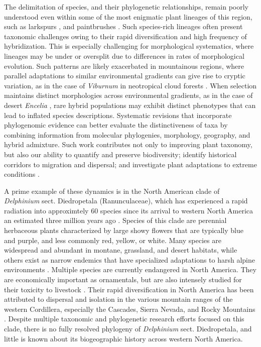 \documentclass[11pt]{article}
\begin{document}
The delimitation of species, and their phylogenetic relationships, remain poorly
understood even within some of the most enigmatic plant lineages of this region, 
such as larkspurs \citep{jabbour_phylogeny_2012, xiang_Recircumscription_2017}, 
and paintbrushes \citep{tank_phylogenetic_2009,jacobs_quantifying_2025}.
% 
Such species-rich lineages often present taxonomic challenges owing to their 
rapid diversification and high frequency of hybridization.
% 
This is especially challenging for morphological systematics, where lineages
may be under or oversplit due to differences in rates of morphological evolution.
% 
Such patterns are likely exacerbated in mountainous regions, where 
parallel adaptations to similar environmental gradients can give rise
to cryptic variation, as in the case of \emph{Viburnum} in neotropical 
cloud forests \citep{donoghue_replicated_2022}. 
% 
When selection maintains distinct morphologies across environmental
gradients, as in the case of desert \emph{Encelia} 
\citep{divittorio_natural_2020}, rare hybrid populations may exhibit
distinct phenotypes that can lead to inflated species descriptions.
% 
Systematic revisions that incorporate phylogenomic evidence can better
evaluate the distinctiveness of taxa by combining information from molecular
phylogenies, morphology, geography, and hybrid admixture.
% 
Such work contributes not only to improving plant taxonomy, but also 
our ability to quantify and preserve biodiversity; identify historical 
corridors to migration and dispersal; and investigate plant adaptations 
to extreme conditions \citep{anstett_2021, gross_unforeseen_2024, melton_draft_2021}. 


A prime example of these dynamics is in the North American clade of \emph{Delphinium} 
sect. Diedropetala (Ranunculaceae), which has experienced a rapid radiation 
into approximtely 60 species since its arrival to western North America an 
estimated three million years ago \citep{jabbour_phylogeny_2012}.
% 
Species of this clade are perennial herbaceous plants characterized by large 
showy flowers that are typically blue and purple, and less commonly red, yellow, 
or white. 
% 
Many species are widespread and abundant in montane, grassland, and desert habitats,
while others exist as narrow endemics that have specialized adaptations to harsh 
alpine environments \citep{warnock_taxonomic_1995}. 
% 
Multiple species are currently endangered in North America. 
They are economically important as ornamentals, but are also intensely studied for 
their toxicity to livestock \citep{cook_2009, cook_two_2017, gardner_taxonomic_2002, pfister_grazing_2014}.
Their rapid diversification in North America has been attributed to dispersal and 
isolation in the various mountain ranges of the western Cordillera, especially the
Cascades, Sierra Nevada, and Rocky Mountains \citep{Warnock_1997}.
% 
Despite multiple taxonomic and phylogenetic research efforts focused on this clade,
there is no fully resolved phylogeny of \emph{Delphinium} sect. Diedropetala,
and little is known about its biogeographic history across western North America.
\end{document}
